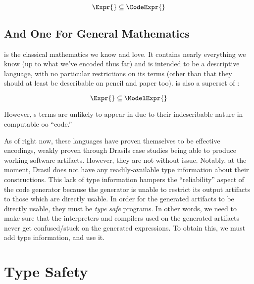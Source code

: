 \[\Expr{} \subseteq{} \CodeExpr{}\]

\subsection{And One For General Mathematics}

\ModelExpr{} is the classical mathematics we know and love. It contains nearly
everything we know (up to what we've encoded thus far) and is intended to be a
descriptive language, with no particular restrictions on its terms (other than
that they should at least be describable on pencil and paper too). \ModelExpr{}
is also a superset of \Expr{}:

\[\Expr{} \subseteq{} \ModelExpr{}\]

However, \ModelExpr{}s terms are unlikely to appear in \CodeExpr{} due to their
indescribable nature in computable \acs{oo} ``code.''

As of right now, these languages have proven themselves to be effective
encodings, weakly proven through Drasils case studies being able to produce
working software artifacts. However, they are not without issue. Notably, at the
moment, Drasil does not have any readily-available type information about their
constructions. This lack of type information hampers the ``reliability'' aspect
of the code generator because the generator is unable to restrict its output
artifacts to those which are directly usable. In order for the generated
artifacts to be directly usable, they must be \textit{type safe} programs. In
other words, we need to make sure that the interpreters and compilers used on
the generated artifacts never get confused/stuck on the generated expressions.
To obtain this, we must add type information, and use it.

\section{Type Safety}





